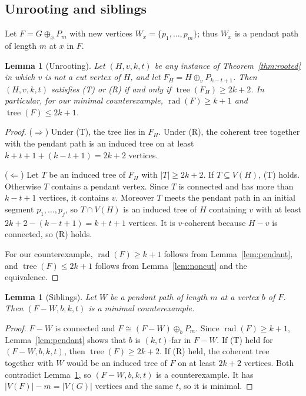 \documentclass[11pt,a4paper]{article}
\newtheorem{lemma}[theorem]{Lemma}
\theoremstyle{definition}
\newcommand{\rad}{\operatorname{rad}}
\newcommand{\tr}{\operatorname{tree}}
\newcommand{\plus}{\oplus}
\begin{document}
\subsection{Unrooting and siblings}

Let $F=G\plus_x P_m$ with new vertices $W_x=\{p_1,\dots,p_m\}$; thus $W_x$ is a pendant path of length $m$ at $x$ in $F$.

\begin{lemma}[Unrooting]\label{lem:unroot}
Let $(H,v,k,t)$ be any instance of Theorem~\ref{thm:rooted} in which $v$ is not a cut vertex of $H$, and let $F_H=H\plus_v P_{k-t+1}$. Then $(H,v,k,t)$ satisfies (T) or (R) if and only if $\tr(F_H)\ge 2k+2$. In particular, for our minimal counterexample, $\rad(F)\ge k+1$ and $\tr(F)\le 2k+1$.
\end{lemma}

\begin{proof}
($\Rightarrow$) Under (T), the tree lies in $F_H$. Under (R), the coherent tree together with the pendant path is an induced tree on at least $k+t+1+(k-t+1)=2k+2$ vertices.

($\Leftarrow$) Let $T$ be an induced tree of $F_H$ with $|T|\ge2k+2$. If $T\subseteq V(H)$, (T) holds. Otherwise $T$ contains a pendant vertex. Since $T$ is connected and has more than $k-t+1$ vertices, it contains $v$. Moreover $T$ meets the pendant path in an initial segment $p_1,\dots,p_j$, so $T\cap V(H)$ is an induced tree of $H$ containing $v$ with at least $2k+2-(k-t+1)=k+t+1$ vertices. It is $v$-coherent because $H-v$ is connected, so (R) holds.

For our counterexample, $\rad(F)\ge k+1$ follows from Lemma~\ref{lem:pendant}, and $\tr(F)\le2k+1$ follows from Lemma~\ref{lem:noncut} and the equivalence.
\end{proof}

\begin{lemma}[Siblings]\label{lem:sibling}
Let $W$ be a pendant path of length $m$ at a vertex $b$ of $F$. Then $(F-W,b,k,t)$ is a minimal counterexample.
\end{lemma}

\begin{proof}
$F-W$ is connected and $F\cong(F-W)\plus_bP_m$. Since $\rad(F)\ge k+1$, Lemma~\ref{lem:pendant} shows that $b$ is $(k,t)$-far in $F-W$. If (T) held for $(F-W,b,k,t)$, then $\tr(F)\ge2k+2$. If (R) held, the coherent tree together with $W$ would be an induced tree of $F$ on at least $2k+2$ vertices. Both contradict Lemma~\ref{lem:unroot}, so $(F-W,b,k,t)$ is a counterexample. It has $|V(F)|-m=|V(G)|$ vertices and the same $t$, so it is minimal.
\end{proof}
\end{document}
